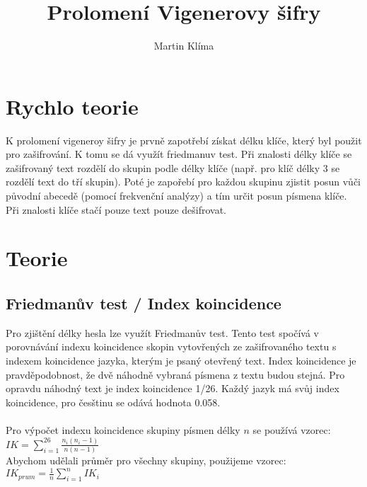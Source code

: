 \documentclass{article}
\title{Prolomení Vigenerovy šifry}
\author{Martin Klíma}
\begin{document}
\maketitle

\section{Rychlo teorie}
K prolomení vigeneroy šifry je prvně zapotřebí získat délku klíče, 
který byl použit pro zašifrování. K tomu se dá využít friedmanuv test. 
Při znalosti délky klíče se zašifrovaný text rozdělí do skupin podle 
délky klíče (např. pro klíč délky 3 se rozdělí text do tří skupin). 
Poté je zapořebí pro každou skupinu zjistit posun vůči původní abecedě 
(pomocí frekvenční analýzy) a tím určit posun písmena klíče. Při znalosti 
klíče stačí pouze text pouze dešifrovat.

\section{Teorie}
\subsection{Friedmanův test / Index koincidence}
Pro zjištění délky hesla lze využít Friedmanův test. Tento test spočívá 
v porovnávání indexu koincidence skopin vytovřených ze zašifrovaného 
textu s indexem koincidence jazyka, kterým je psaný otevřený text. Index 
koincidence je pravděpodobnost, že dvě náhodně vybraná písmena z textu 
budou stejná. Pro opravdu náhodný text je index koincidence 1/26. Každý 
jazyk má svůj index koincidence, pro česštinu se odává hodnota 0.058. 
\\\\
Pro výpočet indexu koincidence skupiny písmen délky $n$ se používá vzorec: 
$IK = \sum \limits_{i=1}^{26} \frac{n_i (n_i - 1)}{n (n - 1)}$\\
Abychom udělali průměr pro všechny skupiny, použijeme vzorec:
$IK_{prum} = \frac{1}{n} \sum \limits_{i=1}^{n} IK_i$\\
\end{document}
